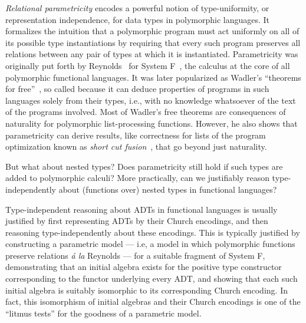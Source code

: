 \documentclass[runningheads]{llncs}
\begin{document}
{\em Relational parametricity} encodes a powerful notion of
type-uniformity, or representation independence, for data types in
polymorphic languages. It formalizes the intuition that a polymorphic
program must act uniformly on all of its possible type instantiations
by requiring that every such program preserves all relations between
any pair of types at which it is instantiated. Parametricity was
originally put forth by Reynolds~\cite{rey83} for System
F~\cite{gir72}, the calculus at the core of all polymorphic functional
languages. It was later popularized as Wadler's ``theorems for
free''~\cite{wad89}, so called because it can deduce properties of
programs in such languages solely from their types, i.e., with no
knowledge whatsoever of the text of the programs involved.
Most of Wadler's free theorems are consequences of naturality for
polymorphic list-processing functions. However, he also shows that
parametricity can derive
results, like correctness for lists of the program optimization known
as {\em short cut fusion}~\cite{glp93}, that go beyond just
naturality.

But what about nested types? Does parametricity still hold if such
types are added to polymorphic calculi? More practically, can we
justifiably reason type-independently about (functions over) nested
types in functional languages?

Type-independent reasoning about ADTs in functional languages is
usually justified by first representing ADTs by their Church
encodings, and then reasoning type-independently about these
encodings. This is typically justified by constructing a parametric
model --- i.e, a model in which polymorphic functions preserve
relations {\em \'a la} Reynolds --- for a suitable fragment of System
F, demonstrating that an initial algebra exists for the positive type
constructor corresponding to the functor underlying every ADT, and
showing that each such initial algebra is suitably isomorphic to its
corresponding Church encoding. In fact, this isomorphism of initial
algebras and their Church encodings is one of the ``litmus tests'' for
the goodness of a parametric model.
\end{document}
